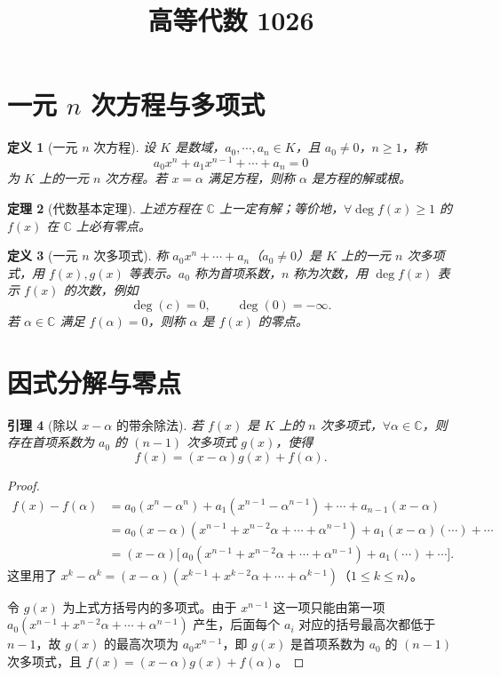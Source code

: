 \documentclass[UTF8,11pt]{ctexart}
\title{高等代数 1026}
\date{}
\theoremstyle{cnthm}
\newtheorem{thm}{定理}[section]
\newtheorem{lem}[thm]{引理}
\newtheorem{defn}[thm]{定义}
\begin{document}
\maketitle

\section{一元 $n$ 次方程与多项式}

\begin{defn}[一元 $n$ 次方程]
设 $K$ 是数域，$a_0,\cdots,a_n\in K$，且 $a_0\neq0$，$n\geq1$，称
\[
a_0x^n+a_1x^{n-1}+\cdots+a_n=0
\]
为 $K$ 上的一元 $n$ 次方程。若 $x=\alpha$ 满足方程，则称 $\alpha$ 是方程的解或根。
\end{defn}

\begin{thm}[代数基本定理]
上述方程在 $\mathbb{C}$ 上一定有解；等价地，$\forall\deg f(x)\geq1$ 的 $f(x)$ 在 $\mathbb{C}$ 上必有零点。
\end{thm}

\begin{defn}[一元 $n$ 次多项式]
称 $a_0x^n+\cdots+a_n$（$a_0\neq0$）是 $K$ 上的一元 $n$ 次多项式，用 $f(x),g(x)$ 等表示。$a_0$ 称为首项系数，$n$ 称为次数，用 $\deg f(x)$ 表示 $f(x)$ 的次数，例如
\[
\deg(c)=0,\qquad \deg(0)=-\infty.
\]
若 $\alpha\in\mathbb{C}$ 满足 $f(\alpha)=0$，则称 $\alpha$ 是 $f(x)$ 的零点。
\end{defn}

\section{因式分解与零点}

\begin{lem}[除以 $x-\alpha$ 的带余除法]
若 $f(x)$ 是 $K$ 上的 $n$ 次多项式，$\forall\alpha\in\mathbb{C}$，则存在首项系数为 $a_0$ 的 $(n-1)$ 次多项式 $g(x)$，使得
\[
f(x)=(x-\alpha)g(x)+f(\alpha).
\]
\end{lem}

\begin{proof}
\[
\begin{aligned}
f(x)-f(\alpha)
&=a_0(x^{n}-\alpha^{n})+a_1(x^{n-1}-\alpha^{n-1})+\cdots+a_{n-1}(x-\alpha)\\
&=a_0(x-\alpha)(x^{n-1}+x^{n-2}\alpha+\cdots+\alpha^{n-1})
  +a_1(x-\alpha)(\cdots)+\cdots\\
&=(x-\alpha)\bigl[\,a_0(x^{n-1}+x^{n-2}\alpha+\cdots+\alpha^{n-1})+a_1(\cdots)+\cdots\bigr].
\end{aligned}
\]
这里用了 $x^{k}-\alpha^{k}=(x-\alpha)(x^{k-1}+x^{k-2}\alpha+\cdots+\alpha^{k-1})$（$1\leq k\leq n$）。

令 $g(x)$ 为上式方括号内的多项式。由于 $x^{n-1}$ 这一项只能由第一项
$a_0(x^{n-1}+x^{n-2}\alpha+\cdots+\alpha^{n-1})$ 产生，后面每个 $a_i$ 对应的括号最高次都低于 $n-1$，故 $g(x)$ 的最高次项为 $a_0x^{n-1}$，即 $g(x)$ 是首项系数为 $a_0$ 的 $(n-1)$ 次多项式，且 $f(x)=(x-\alpha)g(x)+f(\alpha)$。
\end{proof}
\end{document}
